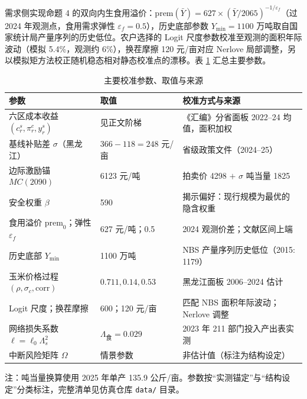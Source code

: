 \documentclass[UTF8,zihao=-4,fontset=fandol]{ctexart}
\numberwithin{equation}{section}
\theoremstyle{definition}
\theoremstyle{remark}
\begin{document}
需求侧实现命题 4 的双向内生食用溢价：$\mathrm{prem}(\bar Y)=627\times(\bar Y/2065)^{-1/\varepsilon_f}$（过 2024 年观测点，食用需求弹性 $\varepsilon_f=0.5$），历史底部参数 $Y_{\min}=1100$ 万吨取自国家统计局产量序列的历史低位。农户选择的 Logit 尺度参数校准至观测的面积年际波动（模拟 5.4\%，观测约 6\%），换茬摩擦 120 元/亩对应 Nerlove 局部调整，另以模拟矩方法校正随机稳态相对静态校准点的漂移。表 \ref{tab:calib} 汇总主要参数。

\begin{table}[H]
\centering
\caption{主要校准参数、取值与来源}
\label{tab:calib}
\begin{threeparttable}
\footnotesize
\begin{tabularx}{\textwidth}{p{}p{}X}
\toprule
参数 & 取值 & 校准方式与来源\\
\midrule
六区成本收益 $(c_r^s,\pi_r^c,y_r^s)$ & 见正文阶梯 & 《汇编》分省面板 2022--24 均值，面积加权\\
基线补贴差 $\sigma$（黑龙江） & $366-118=248$ 元/亩 & 省级政策文件（2024--25）\\
边际激励锚 $MC(2090)$ & 6123 元/吨 & 拍卖价 4298 $+$ $\sigma$ 吨当量 1825\\
安全权重 $\beta$ & 590 & 揭示偏好：现行规模为最优的隐含权重\\
食用溢价 $\mathrm{prem}_0$；弹性 $\varepsilon_f$ & 627 元/吨；0.5 & 2024 观测价差；文献区间上端\\
历史底部 $Y_{\min}$ & 1100 万吨 & NBS 产量序列历史低位（2015: 1179）\\
玉米价格过程 $(\rho,\sigma_c,\mathrm{corr})$ & $0.711,0.14,0.53$ & 黑龙江面板 2006--2024 估计\\
Logit 尺度；换茬摩擦 & 600；120 元/亩 & 匹配 NBS 面积年际波动；Nerlove 调整\\
网络损失系数 $\ell=\ell_0\Lambda_s^2$ & $\Lambda_{\text{食}}=0.029$ & 2023 年 211 部门投入产出表实测\\
中断风险矩阵 $\Omega$ & 情景参数 & 非估计值（标注为结构设定）\\
\bottomrule
\end{tabularx}
\begin{tablenotes}[flushleft]
\footnotesize
\item 注：吨当量换算使用 2025 年单产 135.9 公斤/亩。参数按“实测锚定”与“结构设定”分类标注，完整清单见仿真仓库 \texttt{data/} 目录。
\end{tablenotes}
\end{threeparttable}
\end{table}
\end{document}
